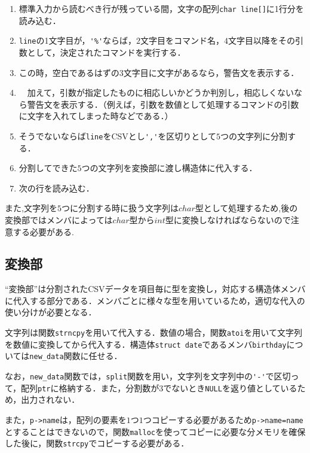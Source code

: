 \documentclass[a4j,11pt]{jarticle}
\begin{document}
\begin{enumerate}
\setlength{\parskip}{2pt} \setlength{\itemsep}{2pt}
\renewcommand{\labelenumi}{(\alph{enumi})} 
    \item 標準入力から読むべき行が残っている間，文字の配列\verb|char line[]|に1行分を読み込む．
    \item \verb|line|の1文字目が，\verb|'%'|ならば，$2$文字目をコマンド名，$4$文字目以降をその引数として，決定されたコマンドを実行する．
    \item この時，空白であるはずの$3$文字目に文字があるなら，警告文を表示する．
    \item　加えて，引数が指定したものに相応しいかどうか判別し，相応しくないなら警告文を表示する．（例えば，引数を数値として処理するコマンドの引数に文字を入れてしまった時などである．）
    \item そうでないならば\verb|line|をCSVとし\verb|','|を区切りとして$5$つの文字列に分割する．
    \item 分割してできた$5$つの文字列を変換部に渡し構造体に代入する．
    \item 次の行を読み込む．
\end{enumerate}

また,文字列を$5$つに分割する時に扱う文字列は$char$型として処理するため,後の変換部ではメンバによっては$char$型から$int$型に変換しなければならないので注意する必要がある.

\subsection{変換部} \label{sec:change}
``変換部''は分割されたCSVデータを項目毎に型を変換し，対応する構造体メンバに代入する部分である．メンバごとに様々な型を用いているため，適切な代入の使い分けが必要となる．

文字列は関数\verb|strncpy|を用いて代入する．数値の場合，関数\verb|atoi|を用いて文字列を数値に変換してから代入する．構造体\verb|struct date|であるメンバ\verb|birthday|については\verb|new_data|関数に任せる．

なお，\verb|new_data|関数では，\verb|split|関数を用い，文字列を文字列中の\verb|'-'|で区切って，配列\verb|ptr|に格納する．また，分割数が$3$でないとき\verb|NULL|を返り値としているため，出力されない．

また，\verb|p->name|は，配列の要素を$1$つ$1$つコピーする必要があるため\verb|p->name=name|とすることはできないので，関数\verb|malloc|を使ってコピーに必要な分メモリを確保した後に，関数\verb|strcpy|でコピーする必要がある．
\end{document}
